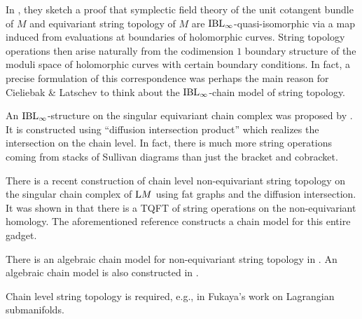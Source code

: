 \documentclass[\MainFolder/Text.tex]{subfiles}
\begin{document}
In \cite{Cieliebak2007}, they sketch a proof that symplectic field theory of the unit cotangent bundle of $M$ and equivariant string topology of $M$ are $\mathrm{IBL}_\infty$-quasi-isomorphic via a map induced from evaluations at boundaries of holomorphic curves. String topology operations then arise naturally from the codimension $1$ boundary structure of the moduli space of holomorphic curves with certain boundary conditions. In fact, a precise formulation of this correspondence was perhaps the main reason for Cieliebak \& Latschev to think about the $\mathrm{IBL}_\infty$-chain model of string topology.

An $\mathrm{IBL}_\infty$-structure on the singular equivariant chain complex was proposed by \cite{Sullivan2005}. It is constructed using ``diffusion intersection product'' which realizes the intersection on the chain level. In fact, there is much more string operations coming from stacks of Sullivan diagrams than just the bracket and cobracket.

There is a recent construction of chain level non-equivariant string topology on the singular chain complex of $\mathrm{L} M$ using fat graphs \cite{Drummond-Cole2015} and the diffusion intersection. It was shown in \cite{Cohen2006} that there is a TQFT of string operations on the non-equivariant homology. The aforementioned reference constructs a chain model for this entire gadget. 

There is an algebraic chain model for non-equivariant string topology in \cite{Chen2012}. An algebraic chain model is also constructed in \cite{Irie2014}. 

Chain level string topology is required, e.g., in Fukaya's work on Lagrangian submanifolds.

%
%
\end{document}
